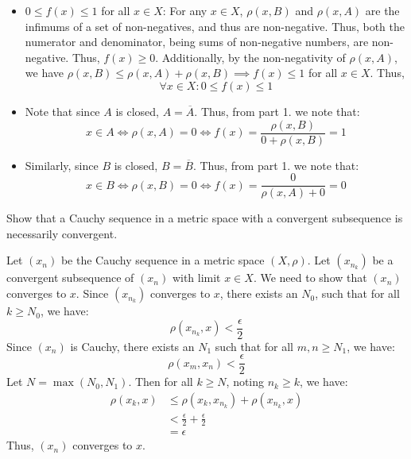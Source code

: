 \documentclass[12pt]{article}
\begin{document}
\begin{solution}
\begin{enumerate}
        \begin{itemize}
            \item $0 \leq f(x) \leq 1$ for all $x \in X$: For any $x \in X$, $\rho(x, B)$ and $\rho(x, A)$ are the infimums of a set of non-negatives, and thus are non-negative. Thus, both the numerator and denominator, being sums of non-negative numbers, are non-negative. Thus, $f(x) \geq 0$. Additionally, by the non-negativity of $\rho(x, A)$, we have $\rho(x, B) \leq \rho(x, A) + \rho(x, B) \implies f(x) \leq 1$ for all $x \in X$. Thus,
            \[ \forall x \in X: 0 \leq f(x) \leq 1 \]
            \item Note that since $A$ is closed, $A = \overline{A}$. Thus, from part 1. we note that: 
            \[ x \in A \iff \rho(x, A) = 0 \iff f(x) = \frac{\rho(x, B)}{0 + \rho(x, B)} = 1\]
            \item Similarly, since $B$ is closed, $B = \overline{B}$. Thus, from part 1. we note that:
            \[ x \in B \iff \rho(x, B) = 0 \iff f(x) = \frac{0}{\rho(x, A) + 0} = 0\]
        \end{itemize}
    \end{enumerate}
\end{solution}
\newpage


\begin{problem}{4}
    Show that a Cauchy sequence in a metric space with a convergent subsequence is necessarily convergent. 
\end{problem}

\begin{solution}
    Let $(x_n)$ be the Cauchy sequence in a metric space $(X, \rho)$. Let $(x_{n_k})$ be a convergent subsequence of $(x_n)$ with limit $x \in X$. We need to show that $(x_n)$ converges to $x$. \bbni
    Since $(x_{n_k})$ converges to $x$, there exists an $N_0$, such that for all $k \geq N_0$, we have:
    \[ \rho(x_{n_k}, x) < \frac{\epsilon}{2} \]
    Since $(x_n)$ is Cauchy, there exists an $N_1$ such that for all $m, n \geq N_1$, we have:
    \[ \rho(x_m, x_n) < \frac{\epsilon}{2} \]
    Let $N = \max(N_0, N_1)$. Then for all $k \geq N$, noting $n_k \geq k$, we have:
    \begin{align*}
        \rho(x_{k}, x) &\leq \rho(x_{k}, x_{n_k}) + \rho(x_{n_k}, x) \\
        &< \frac{\epsilon}{2} + \frac{\epsilon}{2} \\
        &= \epsilon
    \end{align*}
    Thus, $(x_n)$ converges to $x$.
\end{solution}
\newpage
\end{document}
